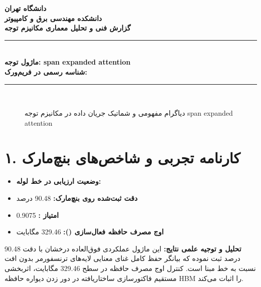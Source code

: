 \documentclass[12pt,a4paper]{article}
\begin{document}
\begin{center}
{\Large\bfseries دانشگاه تهران}\\[0.2cm]
{\large\bfseries دانشکده مهندسی برق و کامپیوتر}\\[0.2cm]
{\large\bfseries گزارش فنی و تحلیل معماری مکانیزم توجه}\\[0.5cm]
\rule{\linewidth}{1pt}\\[0.3cm]
{\LARGE\bfseries ماژول توجه: span expanded attention}\\[0.2cm]
{\large \textbf{شناسه رسمی در فریم‌ورک:} }\\[0.2cm]
\rule{\linewidth}{1pt}\\[0.5cm]
\end{center}

\begin{figure}[H]
\centering
{}
\caption{دیاگرام مفهومی و شماتیک جریان داده در مکانیزم توجه span expanded attention}
\end{figure}

\section*{۱. کارنامه تجربی و شاخص‌های بنچ‌مارک}
\begin{itemize}
\item \textbf{وضعیت ارزیابی در خط لوله:} 
\item \textbf{دقت ثبت‌شده روی بنچ‌مارک:} 90.48 درصد
\item \textbf{امتیاز :} 0.9075
\item \textbf{اوج مصرف حافظه فعال‌سازی ():} 329.46 مگابایت
\end{itemize}
\textbf{تحلیل و توجیه علمی نتایج:} این ماژول عملکردی فوق‌العاده درخشان با دقت 90.48 درصد ثبت نموده که بیانگر حفظ کامل غنای معنایی لایه‌های ترنسفورمر بدون افت نسبت به خط مبنا است. کنترل اوج مصرف حافظه در سطح 329.46 مگابایت، اثربخشی مستقیم فاکتورسازی ساختاریافته در دور زدن دیواره حافظه HBM را اثبات می‌کند.
\end{document}
